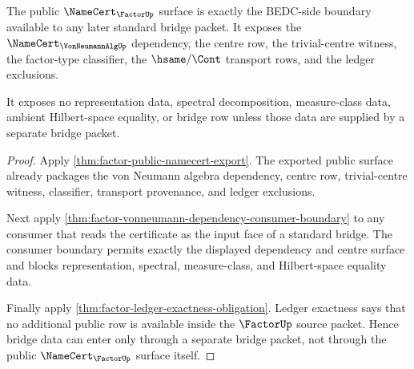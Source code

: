 \begin{theorem}
\label{thm:factor-public-bridge-boundary}
The public $\NameCert_{\FactorUp}$ surface is exactly the BEDC-side boundary
available to any later standard bridge packet. It exposes the
$\NameCert_{\VonNeumannAlgUp}$ dependency, the centre row, the trivial-centre
witness, the factor-type classifier, the $\hsame/\Cont$ transport rows, and the
ledger exclusions.

It exposes no representation data, spectral decomposition, measure-class data,
ambient Hilbert-space equality, or bridge row unless those data are supplied by
a separate bridge packet.
\end{theorem}
\begin{proof}
Apply \autoref{thm:factor-public-namecert-export}. The exported public surface
already packages the von Neumann algebra dependency, centre row,
trivial-centre witness, classifier, transport provenance, and ledger
exclusions.

Next apply \autoref{thm:factor-vonneumann-dependency-consumer-boundary} to any
consumer that reads the certificate as the input face of a standard bridge. The
consumer boundary permits exactly the displayed dependency and centre surface
and blocks representation, spectral, measure-class, and Hilbert-space equality
data.

Finally apply \autoref{thm:factor-ledger-exactness-obligation}. Ledger
exactness says that no additional public row is available inside the
$\FactorUp$ source packet. Hence bridge data can enter only through a separate
bridge packet, not through the public $\NameCert_{\FactorUp}$ surface itself.
\end{proof}

